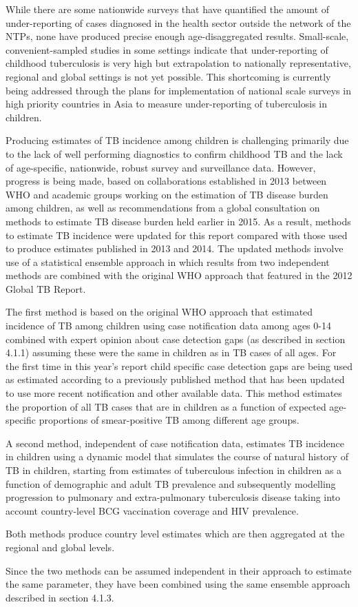 While there are some nationwide surveys that have quantified the amount of under-reporting of cases diagnosed in the health sector outside the network of the NTPs\cite{20487611}\cite{17156496}\cite{18346285}, none have produced precise enough age-disaggregated results. Small-scale, convenient-sampled studies in some settings indicate that under-reporting of childhood tuberculosis is very high\cite{21985569}\cite{Coghlan2015-xn} but extrapolation to nationally representative, regional and global settings is not yet possible. This shortcoming is currently being addressed through the plans for implementation of national scale surveys in high priority countries in Asia to measure under-reporting of tuberculosis in children\cite{Who2014-gv}.

Producing estimates of TB incidence among children is challenging primarily due to the lack of well performing diagnostics to confirm childhood TB and the lack of age-specific, nationwide, robust survey and surveillance data. However, progress is being made, based on collaborations established in 2013 between WHO and academic groups working on the estimation of TB disease burden among children, as well as recommendations from a global consultation on methods to estimate TB disease burden held earlier in 2015. As a result, methods to estimate TB incidence were updated for this report compared with those used to produce estimates published in 2013 and 2014. The updated methods involve use of a statistical ensemble approach in which results from two independent methods are combined with the original WHO approach that featured in the 2012 Global TB Report. 

The first method is based on the original WHO approach that estimated incidence of TB among children using case notification data among ages 0-14 combined with expert opinion about case detection gaps (as described in section 4.1.1) assuming these were the same in children as in TB cases of all ages. For the first time in this year’s report child specific case detection gaps are being used as estimated according to a previously published method\cite{Jenkins_2014} that has been updated to use more recent notification and other available data\cite{Sismanidis_2014}. This method estimates the proportion of all TB cases that are in children as a function of expected age-specific proportions of smear-positive TB among different age groups. 

A second method, independent of case notification data, estimates TB incidence in children using a dynamic model that simulates the course of natural history of TB in children, starting from estimates of tuberculous infection in children as a function of demographic and adult TB prevalence and subsequently modelling progression to pulmonary and extra-pulmonary tuberculosis disease taking into account country-level BCG vaccination coverage and HIV prevalence\cite{Dodd_2014}. 

Both methods produce country level estimates which are then aggregated at the regional and global levels.

Since the two methods can be assumed independent in their approach to estimate the same parameter, they have been combined using the same ensemble approach described in section 4.1.3.

